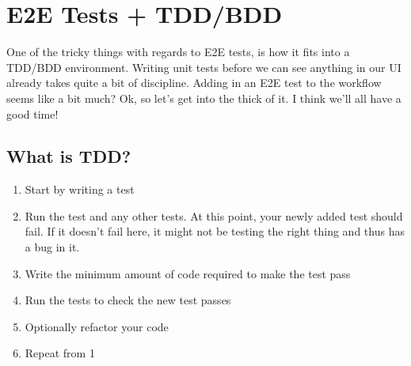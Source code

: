 \maketitle{}
\section{ E2E Tests + TDD/BDD }

One of the tricky things with regards to E2E tests, is how it fits into a
TDD/BDD environment. Writing unit tests before we can see anything in our UI
already takes quite a bit of discipline. Adding in an E2E test to the workflow
seems like a bit much? Ok, so let's get into the thick of it. I think we'll all
have a good time!

\subsection{ What is TDD? }

\begin{enumerate}
  \item Start by writing a test
  \item Run the test and any other tests. At this point, your newly added test
   should fail. If it doesn’t fail here, it might not be testing the right
   thing and thus has a bug in it.
  \item Write the minimum amount of code required to make the test pass
  \item Run the tests to check the new test passes
  \item Optionally refactor your code
  \item Repeat from 1
\end{enumerate}

